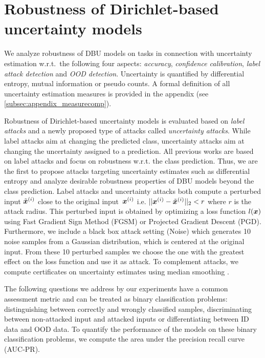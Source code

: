 \section{Robustness of Dirichlet-based uncertainty models}
\label{sec:attack_dirichlet_model_008}

We analyze robustness of DBU models on tasks in connection with uncertainty estimation w.r.t.\ the following four aspects: \emph{accuracy}, \emph{confidence calibration}, \emph{label attack detection} and \emph{OOD detection}. Uncertainty is quantified by differential entropy, mutual information or pseudo counts. 
A formal definition of all uncertainty estimation measures is provided in the appendix (see \cref{subsec:appendix_measurecomp}).  

Robustness of Dirichlet-based uncertainty models is evaluated based on \emph{label attacks} and a newly proposed type of attacks called \emph{uncertainty attacks}. 
While label attacks aim at changing the predicted class, uncertainty attacks aim at changing the uncertainty assigned to a prediction. 
All previous works are based on label attacks and focus on robustness w.r.t. the class prediction. Thus, we are the first to propose attacks targeting uncertainty estimates such as differential entropy and analyze desirable robustness properties of DBU models beyond the class prediction. 
Label attacks and uncertainty attacks both compute a perturbed input $\tilde{{\bm{x}}}^{(i)}$ close to the original input~${\bm{x}}^{(i)}$ i.e. $|| {\bm{x}}^{(i)} - \tilde{{\bm{x}}}^{(i)} ||_2 < r$ where $r$ is the attack radius. This perturbed input is obtained by optimizing a loss function $l({\bm{x}})$ using Fast Gradient Sign Method (FGSM) or Projected Gradient Descent (PGD). Furthermore, we include a black box attack setting (Noise) which generates 10 noise samples from a Gaussian distribution, which is centered at the original input. From these 10 perturbed samples we choose the one with the greatest effect on the loss function and use it as attack. 
To complement attacks, we compute certificates on uncertainty estimates using median smoothing \cite{median_smoothing}. 


The following questions we address by our experiments have a common assessment metric and can be treated as binary classification problems: distinguishing between correctly and wrongly classified samples, discriminating between non-attacked input and attacked inputs or differentiating between ID data and OOD data. To quantify the performance of the models on these binary classification problems, we compute the area under the precision recall curve (AUC-PR).

